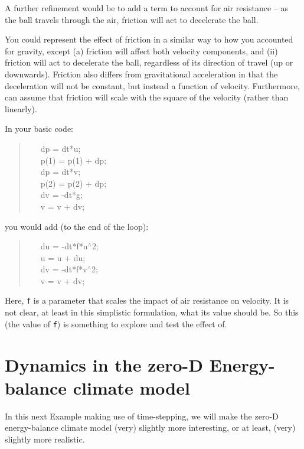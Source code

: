 \documentclass{tufte-book} %
\newenvironment{docspec}{\begin{quotation}\ttfamily\parskip0pt\parindent0pt\ignorespaces}{\end{quotation}}
\begin{document}
\noindent A further refinement would be to add a term to account for air resistance -- as the ball travels through the air, friction will act to decelerate the ball. 

You could represent the effect of friction in a similar way to how you accounted for gravity, except (a) friction will affect both velocity components, and (ii) friction will act to decelerate the ball, regardless of its direction of travel (up or downwards). Friction also differs from gravitational acceleration in that the deceleration will not be constant, but instead a function of velocity. Furthermore, can assume that friction will scale with the square of the velocity (rather than linearly).

In your basic code:
\begin{docspec}
\ \ \ dp = dt*u;\\
\ \ \ p(1) = p(1) + dp;\\
\ \ \ dp = dt*v;\\
\ \ \ p(2) = p(2) + dp;\\
\ \ \ dv = -dt*g;\\
\ \ \ v = v + dv;
\end{docspec}
you would add (to the end of the loop):
\begin{docspec}
\ \ \ du = -dt*f*u\(^{\wedge}\)2;\\
\ \ \ u = u + du;\\
\ \ \ dv = -dt*f*v\(^{\wedge}\)2;\\
\ \ \ v = v + dv;
\end{docspec}

Here, \texttt{f} is a parameter that scales the impact of air resistance on velocity. It is not clear, at least in this simplistic formulation, what its value should be. So this (the value of \texttt{f}) is something to explore and test the effect of.


\newpage


\section{Dynamics in the zero-D Energy-balance climate model}

In this next Example making use of time-stepping, we will make the zero-D energy-balance climate model (very) slightly more interesting, or at least, (very) slightly more realistic.
\end{document}
